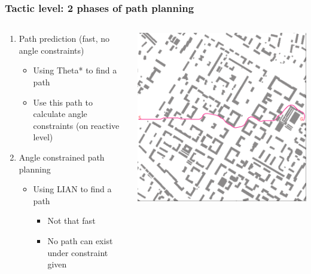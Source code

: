 \documentclass[default]{beamer}
\begin{document}
	\begin{frame}
		\frametitle{Tactic level: 2 phases of path planning}
		\begin{columns}
			\begin{column}{0.7\textwidth}	
				\begin{enumerate}
					\item Path prediction (fast, no angle constraints)
					\begin{itemize}
						\item Using Theta* to find a path
						\item Use this path to calculate angle constraints (on reactive level)
					\end{itemize}
					\item Angle constrained path planning
					\begin{itemize}
						\item Using LIAN to find a path
						\begin{itemize}
							\item Not that fast
							\item No path can exist under constraint given
						\end{itemize}
					\end{itemize}
				\end{enumerate}
			\end{column}
			\begin{column}{0.3\textwidth}
				\centering
				\vspace{10pt}
				\includegraphics[width=\textwidth]{misc/plan_lian}

\end{column}
\end{columns}
\end{frame}
\end{document}
